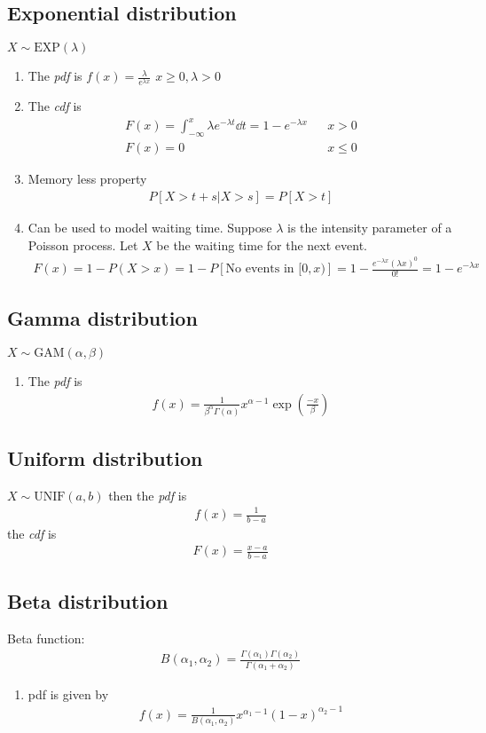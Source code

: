 \documentclass[16pt,a4paper]{article}
\begin{document}
\subsection{Exponential distribution}
$X\sim \text{EXP}(\lambda)$ 
\begin{enumerate}[(1)]
\item The \textit{pdf} is $f(x) = \frac{\lambda}{e^{\lambda x}}$ $x\geq 0, \lambda > 0$
\item The \textit{cdf} is 
\begin{align*}
F(x) = \int_{-\infty}^x \lambda e^{-\lambda t} \dd t = 1 - e^{-\lambda x} && x > 0\\
F(x) = 0 && x \leq  0
\end{align*}
\item Memory less property 
\begin{align*}
P[X > t+s | X > s] = P[X>t]
\end{align*}
\item Can be used to model waiting time. Suppose $\lambda$ is the intensity parameter of a Poisson process. Let $X$ be the waiting time for the next event. 
\begin{align*}
F(x) = 1 - P(X>x) = 1-P[\text{No events in $[0, x)$}] = 1-\frac{e^{-\lambda x}(\lambda x)^0}{0!} = 1-e^{-\lambda x}
\end{align*}
\end{enumerate}

\subsection{Gamma distribution}
$X\sim \text{GAM}(\alpha, \beta)$
\begin{enumerate}[(1)]
\item The \textit{pdf} is 
\begin{align*}
f(x) = \frac{1}{\beta^\alpha \Gamma(\alpha)}x^{\alpha - 1}\exp(\frac{-x}{\beta})
\end{align*}
\end{enumerate}
\subsection{Uniform distribution}
$X\sim \text{UNIF}(a,b)$ then the \textit{pdf} is
\begin{align*}
f(x) = \frac{1}{b-a}
\end{align*}
the \textit{cdf} is 
\begin{align*}
F(x) = \frac{x-a}{b-a}
\end{align*}
\newpage
\subsection{Beta distribution}
Beta function: 
\begin{align*}
B(\alpha_1, \alpha_2) = \frac{\Gamma(\alpha_1)\Gamma(\alpha_2)}{\Gamma(\alpha_1+\alpha_2)}
\end{align*}
\begin{enumerate}[(1)]
\item pdf is given by 
\begin{align*}
f(x) = \frac{1}{B(\alpha_1, \alpha_2)}x^{\alpha_1-1}(1-x)^{\alpha_2-1}
\end{align*}
\end{enumerate}
\end{document}
